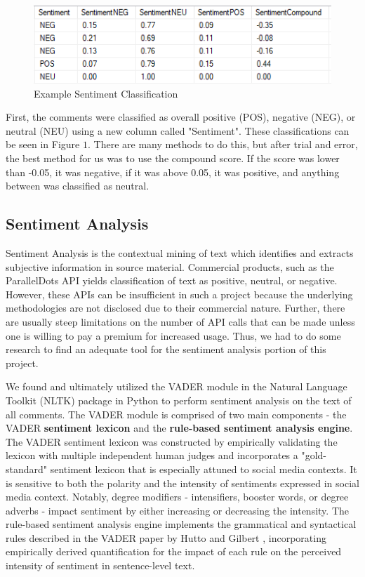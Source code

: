 \documentclass[letterpaper]{article}
\begin{document}
\begin{figure}[!htb]
\begin{center}
\includegraphics[scale=0.6]{sentiment_score.PNG}
\caption{Example Sentiment Classification}
\label{fig1}
\end{center}
\end{figure}

First, the comments were classified as overall positive (POS), negative (NEG), or neutral (NEU) using a new column called "Sentiment". These classifications can be seen in Figure $1$. There are many methods to do this, but after trial and error, the best method for us was to use the compound score. If the score was lower than -0.05, it was negative, if it was above 0.05, it was positive, and anything between was classified as neutral.

\subsection{Sentiment Analysis}

Sentiment Analysis is the contextual mining of text which identifies and extracts subjective information in source material. Commercial products, such as the ParallelDots API yields classification of text as positive, neutral, or negative. However, these APIs can be insufficient in such a project because the underlying methodologies are not disclosed due to their commercial nature. Further, there are usually steep limitations on the number of API calls that can be made unless one is willing to pay a premium for increased usage. Thus, we had to do some research to find an adequate tool for the sentiment analysis portion of this project. 

We found and ultimately utilized the VADER module \cite{VaderModule} in the Natural Language Toolkit (NLTK) package in Python to perform sentiment analysis on the text of all comments. The VADER module is comprised of two main components - the VADER \textbf{sentiment lexicon} and the \textbf{rule-based sentiment analysis engine}. The VADER sentiment lexicon was constructed by empirically validating the lexicon with multiple independent human judges and incorporates a "gold-standard" sentiment lexicon that is especially attuned to social media contexts. It is sensitive to both the polarity and the intensity of sentiments expressed in social media context. Notably, degree modifiers - intensifiers, booster words, or degree adverbs - impact sentiment by either increasing or decreasing the intensity. The rule-based sentiment analysis engine implements the grammatical and syntactical rules described in the VADER paper by Hutto and Gilbert \cite{VaderModule}, incorporating empirically derived quantification for the impact of each rule on the perceived intensity of sentiment in sentence-level text. 
\end{document}
